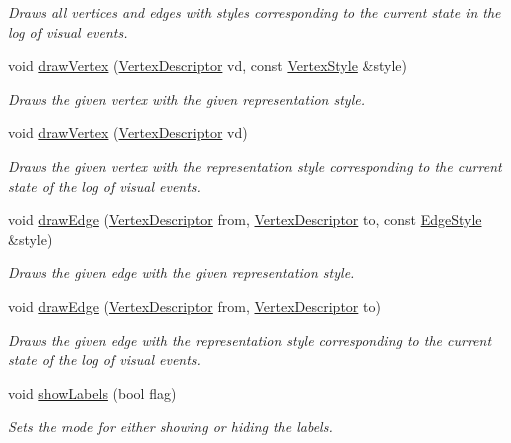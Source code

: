 \begin{DoxyCompactItemize}
\begin{DoxyCompactList}\small\item\em Draws all vertices and edges with styles corresponding to the current state in the log of visual events. \end{DoxyCompactList}\item 
void \hyperlink{structslb_1_1core_1_1ui_1_1Drawer_ac6d8f7dde39ede250e0fbc3b04cc8eea}{draw\+Vertex} (\hyperlink{structslb_1_1core_1_1ui_1_1Drawer_a3106bd6b1354ea4a24c3ef169c1e18b8}{Vertex\+Descriptor} vd, const \hyperlink{structslb_1_1core_1_1ui_1_1VertexStyle}{Vertex\+Style} \&style)
\begin{DoxyCompactList}\small\item\em Draws the given vertex with the given representation style. \end{DoxyCompactList}\item 
void \hyperlink{structslb_1_1core_1_1ui_1_1Drawer_a685a55fbe52a5985fb3daf5379b2a702}{draw\+Vertex} (\hyperlink{structslb_1_1core_1_1ui_1_1Drawer_a3106bd6b1354ea4a24c3ef169c1e18b8}{Vertex\+Descriptor} vd)
\begin{DoxyCompactList}\small\item\em Draws the given vertex with the representation style corresponding to the current state of the log of visual events. \end{DoxyCompactList}\item 
void \hyperlink{structslb_1_1core_1_1ui_1_1Drawer_a703eb519af73b313173016941e21b985}{draw\+Edge} (\hyperlink{structslb_1_1core_1_1ui_1_1Drawer_a3106bd6b1354ea4a24c3ef169c1e18b8}{Vertex\+Descriptor} from, \hyperlink{structslb_1_1core_1_1ui_1_1Drawer_a3106bd6b1354ea4a24c3ef169c1e18b8}{Vertex\+Descriptor} to, const \hyperlink{structslb_1_1core_1_1ui_1_1EdgeStyle}{Edge\+Style} \&style)
\begin{DoxyCompactList}\small\item\em Draws the given edge with the given representation style. \end{DoxyCompactList}\item 
void \hyperlink{structslb_1_1core_1_1ui_1_1Drawer_aa30bec2103851daf685160efa904b447}{draw\+Edge} (\hyperlink{structslb_1_1core_1_1ui_1_1Drawer_a3106bd6b1354ea4a24c3ef169c1e18b8}{Vertex\+Descriptor} from, \hyperlink{structslb_1_1core_1_1ui_1_1Drawer_a3106bd6b1354ea4a24c3ef169c1e18b8}{Vertex\+Descriptor} to)
\begin{DoxyCompactList}\small\item\em Draws the given edge with the representation style corresponding to the current state of the log of visual events. \end{DoxyCompactList}\item 
void \hyperlink{structslb_1_1core_1_1ui_1_1Drawer_a34f3184f19e88390cfe24e95b1c6a41e}{show\+Labels} (bool flag)
\begin{DoxyCompactList}\small\item\em Sets the mode for either showing or hiding the labels. \end{DoxyCompactList}\end{DoxyCompactItemize}
